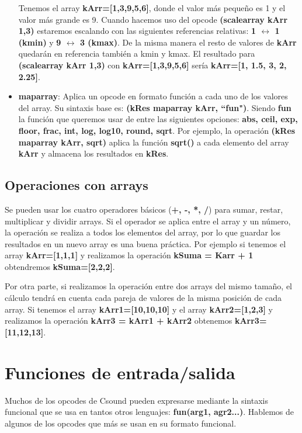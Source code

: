 \begin{itemize}
Tenemos el array \textbf{kArr=[1,3,9,5,6]}, donde el valor más pequeño es 1 y el valor más grande es 9. Cuando hacemos uso del opcode \textbf{(scalearray kArr 1,3)} estaremos escalando con las siguientes referencias relativas: \textbf{1 $\leftrightarrow$ 1 (kmin)} y \textbf{9 $\leftrightarrow$ 3 (kmax)}. De la misma manera el resto de valores de \textbf{kArr} quedarán en referencia también a kmin y kmax. El resultado para \textbf{(scalearray kArr 1,3)} con \textbf{kArr=[1,3,9,5,6]} sería  \textbf{kArr=[1, 1.5, 3, 2, 2.25]}.

 \item \textbf{maparray}: Aplica un opcode en formato función a cada uno de los valores del array. Su sintaxis base es: \textbf{(kRes  maparray kArr, ``fun")}. Siendo \textbf{fun} la función que queremos usar de entre las siguientes opciones: \textbf{abs, ceil, exp, floor, frac, int, log, log10, round, sqrt}. Por ejemplo, la operación \textbf{(kRes  maparray kArr, sqrt)} aplica la función \textbf{sqrt()} a cada elemento del array \textbf{kArr} y almacena los resultados en \textbf{kRes}.
  
\end{itemize}

\subsection{Operaciones con arrays}

Se pueden usar los cuatro operadores básicos (\textbf{+, -, *, /}) para sumar, restar, multiplicar y dividir arrays. Si el operador se aplica entre el array y un número, la operación se realiza a todos los elementos del array, por lo que guardar los resultados en un nuevo array es una buena práctica. Por ejemplo si tenemos el array \textbf{kArr=[1,1,1]} y realizamos la operación \textbf{kSuma = Karr + 1} obtendremos \textbf{kSuma=[2,2,2]}.

Por otra parte, si realizamos la operación entre dos arrays del mismo tamaño, el cálculo tendrá en cuenta cada pareja de valores de la misma posición de cada array. Si tenemos el array \textbf{kArr1=[10,10,10]} y el array \textbf{kArr2=[1,2,3]} y realizamos la operación \textbf{kArr3 = kArr1 + kArr2} obtenemos \textbf{kArr3=[11,12,13]}.

\section{Funciones de entrada/salida}

Muchos de los opcodes de Csound pueden expresarse mediante la sintaxis funcional que se usa en tantos otros lenguajes: \textbf{fun(arg1, agr2...)}. Hablemos de algunos de los opcodes que más se usan en su formato funcional.

